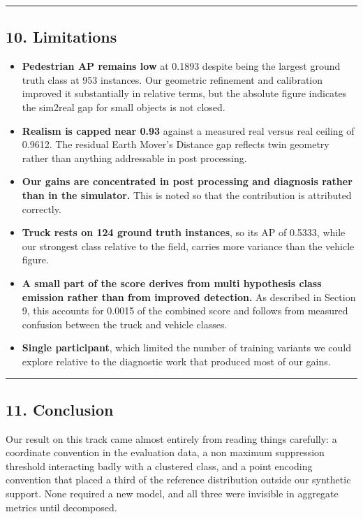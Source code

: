 \documentclass[
  10pt,
]{article}
\providecommand{\tightlist}{%
  \setlength{\itemsep}{0pt}\setlength{\parskip}{0pt}}
\begin{document}
\begin{center}\rule{0.5\linewidth}{0.5pt}\end{center}

\subsection{10. Limitations}\label{limitations}

\begin{itemize}
\tightlist
\item
  \textbf{Pedestrian AP remains low} at 0.1893 despite being the largest
  ground truth class at 953 instances. Our geometric refinement and
  calibration improved it substantially in relative terms, but the
  absolute figure indicates the sim2real gap for small objects is not
  closed.
\item
  \textbf{Realism is capped near 0.93} against a measured real versus
  real ceiling of 0.9612. The residual Earth Mover's Distance gap
  reflects twin geometry rather than anything addressable in post
  processing.
\item
  \textbf{Our gains are concentrated in post processing and diagnosis
  rather than in the simulator.} This is noted so that the contribution
  is attributed correctly.
\item
  \textbf{Truck rests on 124 ground truth instances}, so its AP of
  0.5333, while our strongest class relative to the field, carries more
  variance than the vehicle figure.
\item
  \textbf{A small part of the score derives from multi hypothesis class
  emission rather than from improved detection.} As described in Section
  9, this accounts for 0.0015 of the combined score and follows from
  measured confusion between the truck and vehicle classes.
\item
  \textbf{Single participant}, which limited the number of training
  variants we could explore relative to the diagnostic work that
  produced most of our gains.
\end{itemize}

\begin{center}\rule{0.5\linewidth}{0.5pt}\end{center}

\subsection{11. Conclusion}\label{conclusion}

Our result on this track came almost entirely from reading things
carefully: a coordinate convention in the evaluation data, a non maximum
suppression threshold interacting badly with a clustered class, and a
point encoding convention that placed a third of the reference
distribution outside our synthetic support. None required a new model,
and all three were invisible in aggregate metrics until decomposed.
\end{document}
